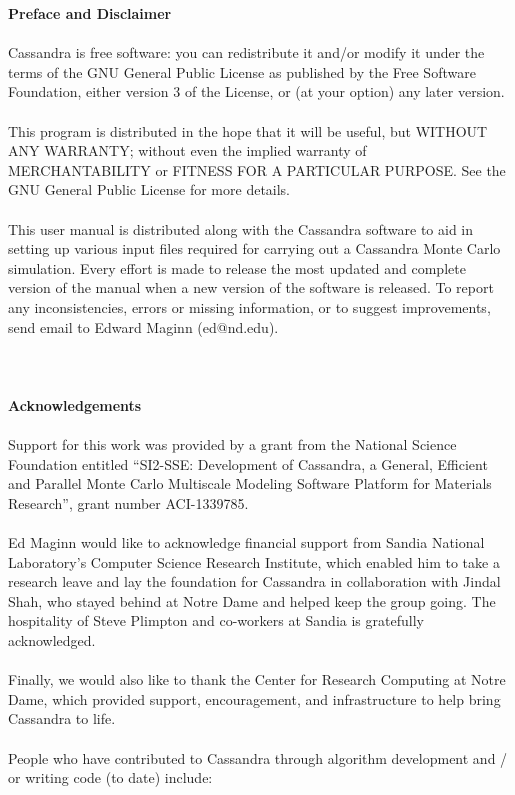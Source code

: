 {\huge \bf{Preface and Disclaimer}} \\ \\
%
Cassandra is free software: you can redistribute it and/or modify
it under the terms of the GNU General Public License as published by
the Free Software Foundation, either version 3 of the License, or
 (at your option) any later version. \\ \\
 This program is distributed in the hope that it will be useful,
 but WITHOUT ANY WARRANTY; without even the implied warranty of
MERCHANTABILITY or FITNESS FOR A PARTICULAR PURPOSE.  See the
GNU General Public License for more details.  \\ \\
%
This user manual is distributed along with the Cassandra software to
aid in setting up various input files required for carrying out a Cassandra
Monte Carlo simulation. Every effort is made to release the most
updated and complete version of the manual when a new version of the
software is released. To report any inconsistencies, errors or missing
information, or to suggest improvements, send email to Edward Maginn
(ed@nd.edu). \\ \\  
%
\pagebreak
\\ \\
{\huge \bf{Acknowledgements}} \\ \\
Support for this work was provided by a grant from the National Science Foundation entitled ``SI2-SSE: Development of Cassandra, a General, Efficient and Parallel Monte Carlo Multiscale Modeling Software Platform for Materials Research'', grant number ACI-1339785.
\\ \\
Ed Maginn would like to acknowledge financial support from Sandia National Laboratory's Computer Science Research Institute, which enabled him to take a research leave and lay the foundation for Cassandra in collaboration with Jindal Shah, who stayed behind at Notre Dame and helped keep the group going. The hospitality of Steve Plimpton and co-workers at Sandia is gratefully acknowledged. 
\\ \\ 
Finally, we would also like to thank the Center for Research Computing at Notre Dame, which provided support, encouragement, and infrastructure to help bring Cassandra to life.
\\ \\
People who have contributed to Cassandra through algorithm development and / or writing code (to date) include:

